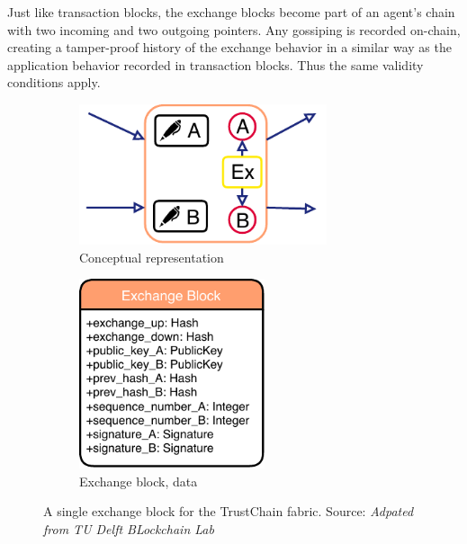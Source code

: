 Just like transaction blocks, the exchange blocks become part of an agent's chain with two incoming
and two outgoing pointers. Any gossiping is recorded on-chain, creating a tamper-proof history 
of the exchange behavior in a similar way as the application behavior recorded in transaction blocks.
Thus the same validity conditions apply. 

\begin{figure}
    \centering
    \begin{subfigure}{0.49\textwidth}
        \centering
        \includegraphics[width=0.8\textwidth]{images/exchange_block.pdf}
        \caption{Conceptual representation}
        \label{fig:exchange_block_conceptual}
    \end{subfigure}
    \begin{subfigure}{0.49\textwidth}
        \centering
        \includegraphics[width=0.6\textwidth]{images/exchange_block_data.pdf}
        \caption{Exchange block, data}
        \label{fig:exchange_block_data}
    \end{subfigure}
    \caption{A single exchange block for the TrustChain fabric. Source: \textit{Adpated from TU Delft BLockchain Lab}}
    \label{fig:exchange_block}
\end{figure}


